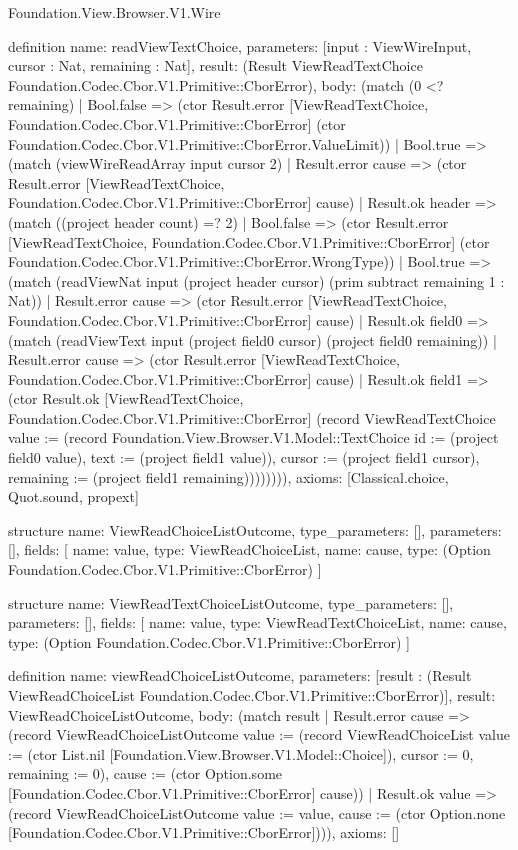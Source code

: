 \begin{lexlean}{Foundation.View.Browser.V1.Wire}
\begin{semanticmodule}
definition{
  name: readViewTextChoice,
  parameters: [input : ViewWireInput, cursor : Nat, remaining : Nat],
  result: (Result ViewReadTextChoice Foundation.Codec.Cbor.V1.Primitive::CborError),
  body: (match (0 <? remaining)
    | Bool.false => (ctor Result.error [ViewReadTextChoice, Foundation.Codec.Cbor.V1.Primitive::CborError] (ctor Foundation.Codec.Cbor.V1.Primitive::CborError.ValueLimit))
    | Bool.true => (match (viewWireReadArray input cursor 2)
      | Result.error cause => (ctor Result.error [ViewReadTextChoice, Foundation.Codec.Cbor.V1.Primitive::CborError] cause)
      | Result.ok header => (match ((project header count) =? 2)
        | Bool.false => (ctor Result.error [ViewReadTextChoice, Foundation.Codec.Cbor.V1.Primitive::CborError] (ctor Foundation.Codec.Cbor.V1.Primitive::CborError.WrongType))
        | Bool.true => (match (readViewNat input (project header cursor) (prim subtract remaining 1 : Nat))
          | Result.error cause => (ctor Result.error [ViewReadTextChoice, Foundation.Codec.Cbor.V1.Primitive::CborError] cause)
          | Result.ok field0 => (match (readViewText input (project field0 cursor) (project field0 remaining))
            | Result.error cause => (ctor Result.error [ViewReadTextChoice, Foundation.Codec.Cbor.V1.Primitive::CborError] cause)
            | Result.ok field1 => (ctor Result.ok [ViewReadTextChoice, Foundation.Codec.Cbor.V1.Primitive::CborError] (record ViewReadTextChoice {value := (record Foundation.View.Browser.V1.Model::TextChoice {id := (project field0 value), text := (project field1 value)}), cursor := (project field1 cursor), remaining := (project field1 remaining)}))))))),
  axioms: [Classical.choice, Quot.sound, propext]
}

structure{
  name: ViewReadChoiceListOutcome,
  type_parameters: [],
  parameters: [],
  fields: [
    {name: value, type: ViewReadChoiceList},
    {name: cause, type: (Option Foundation.Codec.Cbor.V1.Primitive::CborError)}
  ]
}

structure{
  name: ViewReadTextChoiceListOutcome,
  type_parameters: [],
  parameters: [],
  fields: [
    {name: value, type: ViewReadTextChoiceList},
    {name: cause, type: (Option Foundation.Codec.Cbor.V1.Primitive::CborError)}
  ]
}

definition{
  name: viewReadChoiceListOutcome,
  parameters: [result : (Result ViewReadChoiceList Foundation.Codec.Cbor.V1.Primitive::CborError)],
  result: ViewReadChoiceListOutcome,
  body: (match result
    | Result.error cause => (record ViewReadChoiceListOutcome {value := (record ViewReadChoiceList {value := (ctor List.nil [Foundation.View.Browser.V1.Model::Choice]), cursor := 0, remaining := 0}), cause := (ctor Option.some [Foundation.Codec.Cbor.V1.Primitive::CborError] cause)})
    | Result.ok value => (record ViewReadChoiceListOutcome {value := value, cause := (ctor Option.none [Foundation.Codec.Cbor.V1.Primitive::CborError])})),
  axioms: []
}


\end{semanticmodule}
\end{lexlean}
